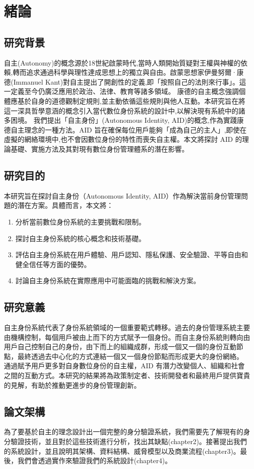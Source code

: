 
\chapter{緒論}
\section{研究背景}
自主(Autonomy)的概念源於18世紀啟蒙時代,當時人類開始質疑對王權與神權的依賴,轉而追求通過科學與理性達成思想上的獨立與自由。啟蒙思想家伊曼努爾·康德(Immanuel Kant)對自主提出了開創性的定義,即「按照自己的法則來行事」。這一定義至今仍廣泛應用於政治、法律、教育等諸多領域。\newline
康德的自主概念強調個體應基於自身的道德觀制定規則,並主動依循這些規則與他人互動。本研究旨在將這一深具哲學意涵的概念引入當代數位身份系統的設計中,以解決現有系統中的諸多困境。\newline
我們提出「自主身份」(Autonomous Identity, AID)的概念,作為實踐康德自主理念的一種方法。AID 旨在確保每位用戶能夠「成為自己的主人」,即使在虛擬的網絡環境中,也不會因數位身份的特性而喪失自主權。本文將探討 AID 的理論基礎、實施方法及其對現有數位身份管理體系的潛在影響。
\section{研究目的}
本研究旨在探討自主身份（Autonomous Identity, AID）作為解決當前身份管理問題的潛在方案。具體而言，本文將：
\begin{enumerate}
  \item 分析當前數位身份系統的主要挑戰和限制。
  \item 探討自主身份系統的核心概念和技術基礎。
  \item 評估自主身份系統在用戶體驗、用戶認知、隱私保護、安全驗證、平等自由和健全信任等方面的優勢。
  \item 討論自主身份系統在實際應用中可能面臨的挑戰和解決方案。
\end{enumerate}
\section{研究意義}
自主身份系統代表了身份系統領域的一個重要範式轉移。過去的身份管理系統主要由機構控制，每個用戶被由上而下的方式賦予一個身份。而自主身份系統則轉向由用戶自己控制自己的身份，由下而上的組織成群，形成一個又一個的身份互動節點，最終透過去中心化的方式連結一個又一個身份節點而形成更大的身份網絡。\newline
通過賦予用戶更多對自身數位身份的自主權，AID 有潛力改變個人、組織和社會之間的互動方式。本研究的結果將為政策制定者、技術開發者和最終用戶提供寶貴的見解，有助於推動更進步的身份管理創新。
\section{論文架構}
為了要基於自主的理念設計出一個完整的身分驗證系統，我們需要先了解現有的身分驗證技術，並且對於這些技術進行分析，找出其缺點(chapter2)。接著提出我們的系統設計，並且說明其架構、資料結構、威脅模型以及商業流程(chapter3)。最後，我們會透過實作來驗證我們的系統設計(chapter4)。\newpage